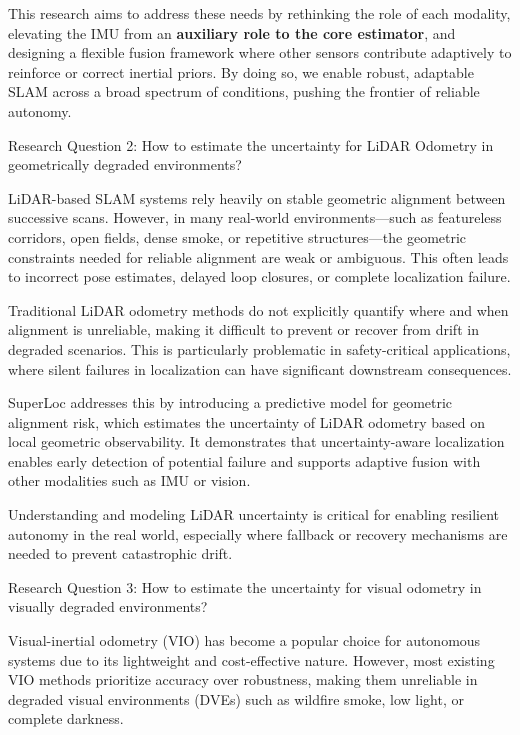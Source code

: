 This research aims to address these needs by rethinking the role of each modality, elevating the IMU from an \textbf{auxiliary role to the core estimator}, and designing a flexible fusion framework where other sensors contribute adaptively to reinforce or correct inertial priors. By doing so, we enable robust, adaptable SLAM across a broad spectrum of conditions, pushing the frontier of reliable autonomy.

\begin{framed}
Research Question 2: How to estimate the uncertainty for LiDAR Odometry in geometrically degraded environments? 
\end{framed}

LiDAR-based SLAM systems rely heavily on stable geometric alignment between successive scans. However, in many real-world environments—such as featureless corridors, open fields, dense smoke, or repetitive structures—the geometric constraints needed for reliable alignment are weak or ambiguous. This often leads to incorrect pose estimates, delayed loop closures, or complete localization failure.

Traditional LiDAR odometry methods do not explicitly quantify where and when alignment is unreliable, making it difficult to prevent or recover from drift in degraded scenarios. This is particularly problematic in safety-critical applications, where silent failures in localization can have significant downstream consequences.

SuperLoc addresses this by introducing a predictive model for geometric alignment risk, which estimates the uncertainty of LiDAR odometry based on local geometric observability. It demonstrates that uncertainty-aware localization enables early detection of potential failure and supports adaptive fusion with other modalities such as IMU or vision.

Understanding and modeling LiDAR uncertainty is critical for enabling resilient autonomy in the real world, especially where fallback or recovery mechanisms are needed to prevent catastrophic drift.

\begin{framed}
Research Question 3: How to estimate the uncertainty for visual odometry in visually degraded environments? 
\end{framed}

Visual-inertial odometry (VIO) has become a popular choice for autonomous systems due to its lightweight and cost-effective nature. However, most existing VIO methods prioritize accuracy over robustness, making them unreliable in degraded visual environments (DVEs) such as wildfire smoke, low light, or complete darkness. 

